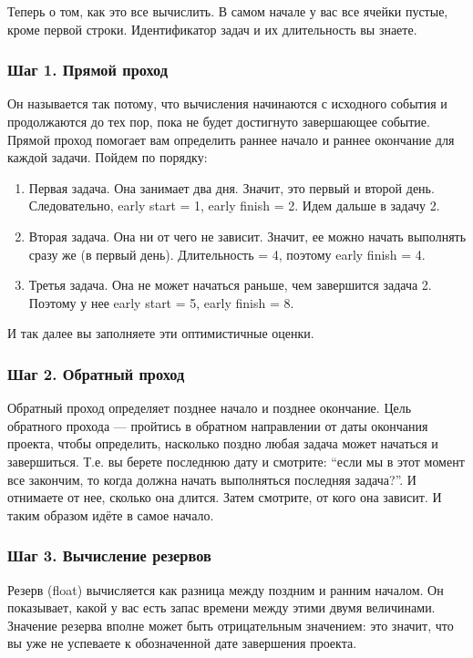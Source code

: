 \documentclass{../../text-style}
\begin{document}
Теперь о том, как это все вычислить. В самом начале у вас все ячейки пустые, кроме первой строки. Идентификатор задач и их длительность вы знаете.

\subsubsection{Шаг 1. Прямой проход}

Он называется так потому, что вычисления начинаются с исходного события и продолжаются до тех пор, пока не будет достигнуто завершающее событие. Прямой проход помогает вам определить раннее начало и раннее окончание для каждой задачи. Пойдем по порядку:

\begin{enumerate}
    \item Первая задача. Она занимает два дня. Значит, это первый и второй день. Следовательно, early start = 1, early finish = 2. Идем дальше в задачу 2.
    \item Вторая задача. Она ни от чего не зависит. Значит, ее можно начать выполнять сразу же (в первый день). Длительность = 4, поэтому early finish = 4.
    \item Третья задача. Она не может начаться раньше, чем завершится задача 2. Поэтому у нее early start = 5, early finish = 8.
\end{enumerate}

И так далее вы заполняете эти оптимистичные оценки.

\subsubsection{Шаг 2. Обратный проход}

Обратный проход  определяет позднее начало и позднее окончание. Цель обратного прохода --- пройтись в обратном направлении от даты окончания проекта, чтобы определить, насколько поздно любая задача может начаться и завершиться. Т.е. вы берете последнюю дату и смотрите: \enquote{если мы в этот момент все закончим, то когда должна начать выполняться последняя задача?}. И отнимаете от нее, сколько она длится. Затем смотрите, от кого она зависит. И таким образом идёте в самое начало. 

\subsubsection{Шаг 3. Вычисление резервов}

Резерв (float) вычисляется как разница между поздним и ранним началом. Он показывает, какой у вас есть запас времени между этими двумя величинами. Значение резерва вполне может быть отрицательным значением: это значит, что вы уже не успеваете к обозначенной дате завершения проекта.
\end{document}
